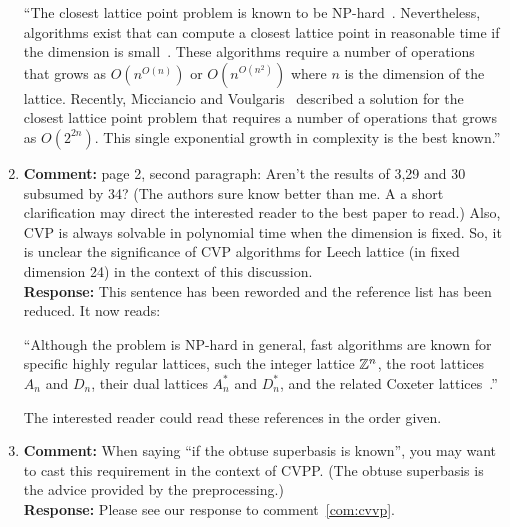 \documentclass[a4paper,10pt]{article}
\begin{document}
\begin{enumerate}
``The closest lattice point problem is known to be NP-hard~\cite{micciancio_hardness_2001, Dinur2003_approximating_CVP_NP_hard,Regev_2004_inappox_lattice_with_preprocessing,feige_inapproximability_2004,Jalden2005_sphere_decoding_complexity}. Nevertheless, algorithms exist that can compute a closest lattice point in reasonable time if the dimension is small~\cite{Pohst_sphere_decoder_1981,Kannan1987_fast_general_np,Agrell2002}.  These algorithms require a number of operations that grows as $O(n^{O(n)})$ or $O(n^{O(n^2)})$ where $n$ is the dimension of the lattice.  Recently, Micciancio and Voulgaris~\cite{MicciancioVoulgaris_deterministic_jv_2013} described a solution for the closest lattice point problem that requires a number of operations that grows as $O(2^{2n})$.  This single exponential growth in complexity is the best known.''

\item\textbf{Comment:}  
page 2, second paragraph: Aren't the results of 3,29 and 30 subsumed by 34? (The authors sure know better than me. A a short clarification may direct the interested reader to the best paper to read.) Also, CVP is always solvable in polynomial time when the dimension is fixed. So, it is unclear the significance of CVP algorithms for Leech lattice (in fixed dimension 24) in the context of this discussion. 
\\\textbf{Response:}
This sentence has been reworded and the reference list has been reduced.  It now reads:

``Although the problem is NP-hard in general, fast algorithms are known for specific highly regular lattices, such the integer lattice ${\mathbb Z}^{n}$, the root lattices $A_n$ and $D_n$, their dual lattices $A_n^*$ and $D_n^*$, and the related Coxeter lattices~\cite[Chap.~4]{SPLAG}\cite{Conway1982FastQuantDec, McKilliam2008, McKilliam2009CoxeterLattices}.''

The interested reader could read these references in the order given. %

\item\textbf{Comment:}  
When saying ``if the obtuse superbasis is known'', you may want to cast this requirement in the context of CVPP. (The obtuse superbasis is the advice provided by the preprocessing.) 
\\\textbf{Response:}
Please see our response to comment~\ref{com:cvvp}.


\end{enumerate}
\end{document}
